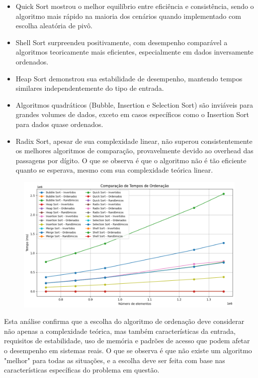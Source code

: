 \documentclass[a4paper, 12pt]{article}
\begin{document}
            \begin{itemize}
                \item Quick Sort mostrou o melhor equilíbrio entre eficiência e consistência, sendo o algoritmo mais rápido na maioria dos cenários quando implementado com escolha aleatória de pivô.
                \item Shell Sort surpreendeu positivamente, com desempenho comparável a algoritmos teoricamente mais eficientes, especialmente em dados inversamente ordenados.
                \item Heap Sort demonstrou sua estabilidade de desempenho, mantendo tempos similares independentemente do tipo de entrada.
                \item Algoritmos quadráticos (Bubble, Insertion e Selection Sort) são inviáveis para grandes volumes de dados, exceto em casos específicos como o Insertion Sort para dados quase ordenados.
                \item Radix Sort, apesar de sua complexidade linear, não superou consistentemente os melhores algoritmos de comparação, provavelmente devido ao overhead das passagens por dígito. O que se observa é que o algoritmo não é tão eficiente quanto se esperava, mesmo com sua complexidade teórica linear.
            \end{itemize}

            \begin{figure}[h!t]
                \centering
                \includegraphics[width=1\textwidth]{images/tudoqueda.png}
            \end{figure}

            Esta análise confirma que a escolha do algoritmo de ordenação deve considerar não apenas a complexidade teórica, mas também características da entrada, requisitos de estabilidade, uso de memória e padrões de acesso que podem afetar o desempenho em sistemas reais. O que se observa é que não existe um algoritmo "melhor" para todas as situações, e a escolha deve ser feita com base nas características específicas do problema em questão.
\end{document}
